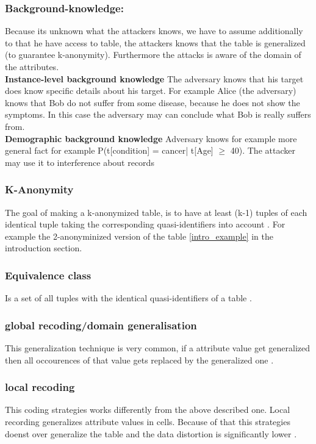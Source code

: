 \documentclass{llncs}
\begin{document}
\subsubsection{Background-knowledge:}
Because its unknown what the attackers knows, we have to assume additionally to that he have access to table, the attackers knows that the table is generalized (to guarantee k-anonymity). Furthermore the attacks is aware of the domain of the attributes.\\
\textbf{Instance-level background knowledge}
The adversary knows that his target does know specific details about his target. For example Alice (the adversary) knows that Bob do not suffer from some disease, because he does not show the symptoms. In this case the adversary may can conclude what Bob is really suffers from.\\
\textbf{Demographic background knowledge}
Adversary knows for example more general fact for example P(t[condition] = cancer| t[Age] $\geq$ 40). The attacker may use it to interference about records \cite{ldiversity}

\subsubsection{K-Anonymity}
The goal of making a k-anonymized table, is to have at least (k-1) tuples of each identical tuple taking the corresponding quasi-identifiers into account \cite{sweeney2002k,li2006achieving}. For example the 2-anonyminized version of the table \ref{intro_example} in the introduction section.
\subsubsection{Equivalence class}
Is a set of all tuples with the identical quasi-identifiers of a table \cite{li2006achieving}.
\subsubsection{global recoding/domain generalisation}
This generalization technique is very common, if a attribute value get generalized then all occourences of that value gets replaced by the generalized one \cite{sweeney2002k,sweeney2002achieving,li2006achieving,incognito}. 
\subsubsection{local recoding}
This coding strategies works differently from the above described one. Local recording generalizes attribute values in cells. Because of that this strategies doenst over generalize the table and the data distortion is significantly lower \cite{li2006achieving}. 
\end{document}
